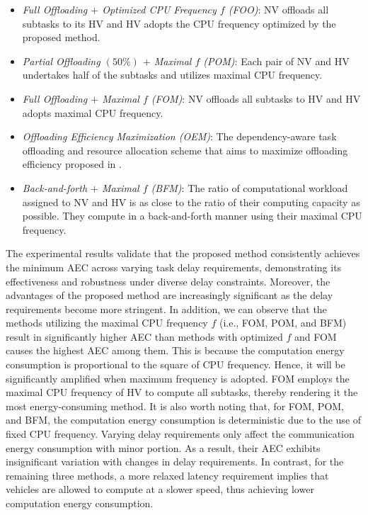 \documentclass[lettersize,journal]{IEEEtran}
\begin{document}
\begin{itemize}

\item \textit{Full Offloading $+$ Optimized CPU Frequency $f$ (FOO)}: NV offloads all subtasks to its HV and HV adopts the CPU frequency optimized by the proposed method.

\item \textit{Partial Offloading $(50\%)$ $+$ Maximal $f$ (POM)}: Each pair of NV and HV undertakes half of the subtasks and utilizes maximal CPU frequency.

\item \textit{Full Offloading $+$ Maximal $f$ (FOM)}: NV offloads all subtasks to HV and HV adopts maximal CPU frequency.

\item \textit{Offloading Efficiency Maximization (OEM)}: The dependency-aware task offloading and resource allocation scheme that aims to maximize offloading efficiency proposed in \cite{ref22}.

\item \textit{Back-and-forth $+$ Maximal $f$ (BFM)}: The ratio of computational workload assigned to NV and HV is as close to the ratio of their computing capacity as possible. They compute in a back-and-forth manner using their maximal CPU frequency.

\end{itemize}

The experimental results validate that the proposed method consistently achieves the minimum AEC across varying task delay requirements, demonstrating its effectiveness and robustness under diverse delay constraints. Moreover, the advantages of the proposed method are increasingly significant as the delay requirements become more stringent. In addition, we can observe that the methods utilizing the maximal CPU frequency $f$ (i.e., FOM, POM, and BFM) result in significantly higher AEC than methods with optimized $f$ and FOM causes the highest AEC among them. This is because the computation energy consumption is proportional to the square of CPU frequency. Hence, it will be significantly amplified when maximum frequency is adopted. FOM employs the maximal CPU frequency of HV to compute all subtasks, thereby rendering it the most energy-consuming method. It is also worth noting that, for FOM, POM, and BFM, the computation energy consumption is deterministic due to the use of fixed CPU frequency. Varying delay requirements only affect the communication energy consumption with minor portion. As a result, their AEC exhibits insignificant variation with changes in delay requirements. In contrast, for the remaining three methods, a more relaxed latency requirement implies that vehicles are allowed to compute at a slower speed, thus achieving lower computation energy consumption.
\end{document}
